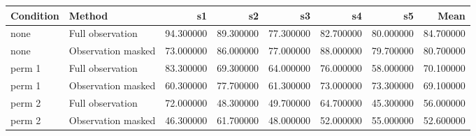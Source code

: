 \begin{tabular}{llrrrrrr}
\toprule
Condition & Method & s1 & s2 & s3 & s4 & s5 & Mean \\
\midrule
none & Full observation & 94.300000 & 89.300000 & 77.300000 & 82.700000 & 80.000000 & 84.700000 \\
none & Observation masked & 73.000000 & 86.000000 & 77.000000 & 88.000000 & 79.700000 & 80.700000 \\
perm 1 & Full observation & 83.300000 & 69.300000 & 64.000000 & 76.000000 & 58.000000 & 70.100000 \\
perm 1 & Observation masked & 60.300000 & 77.700000 & 61.300000 & 73.000000 & 73.300000 & 69.100000 \\
perm 2 & Full observation & 72.000000 & 48.300000 & 49.700000 & 64.700000 & 45.300000 & 56.000000 \\
perm 2 & Observation masked & 46.300000 & 61.700000 & 48.000000 & 52.000000 & 55.000000 & 52.600000 \\
\bottomrule
\end{tabular}
